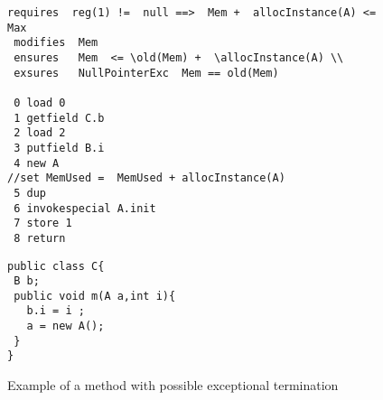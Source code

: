 \begin{figure}[!hbp]


\begin{minipage}[c]{\linewidth}

\begin{lstlisting}[frame=trbl]
 requires  reg(1) !=  null ==>  Mem +  allocInstance(A) <= Max 
 modifies  Mem 
 ensures   Mem  <= \old(Mem) +  \allocInstance(A) \\
 exsures   NullPointerExc  Mem == old(Mem)

 0 load 0
 1 getfield C.b
 2 load 2
 3 putfield B.i
 4 new A 
//set MemUsed =  MemUsed + allocInstance(A)
 5 dup
 6 invokespecial A.init
 7 store 1
 8 return
\end{lstlisting}

\end{minipage}


\begin{minipage}[c]{\linewidth}

\begin{lstlisting}[frame=trbl]
public class C{
 B b;
 public void m(A a,int i){
   b.i = i ;
   a = new A();
 }
}
\end{lstlisting}

\end{minipage}

\caption{\sc Example of a method with possible exceptional termination}
\label{excMeth}
\end{figure}
